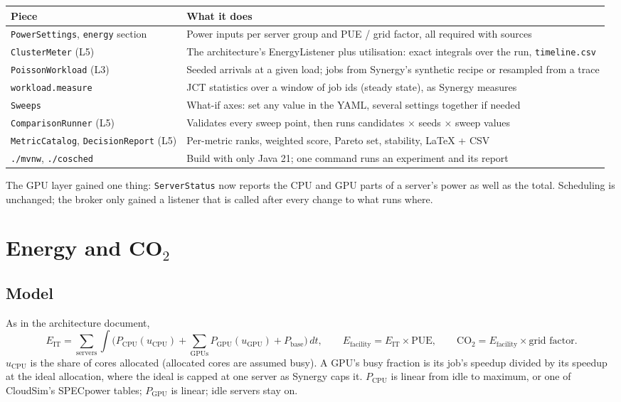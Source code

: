 \documentclass[11pt,a4paper]{article}
\newcommand{\code}[1]{\texttt{#1}}
\begin{document}
\begin{center}
\begin{tabularx}{\linewidth}{@{}lX@{}}
\toprule
Piece & What it does \\
\midrule
\code{PowerSettings}, \code{energy} section & Power inputs per server group and PUE / grid factor, all required with sources \\
\code{ClusterMeter} (L5) & The architecture's EnergyListener plus utilisation: exact integrals over the run, \code{timeline.csv} \\
\code{PoissonWorkload} (L3) & Seeded arrivals at a given load; jobs from Synergy's synthetic recipe or resampled from a trace \\
\code{workload.measure} & JCT statistics over a window of job ids (steady state), as Synergy measures \\
\code{Sweeps} & What-if axes: set any value in the YAML, several settings together if needed \\
\code{ComparisonRunner} (L5) & Validates every sweep point, then runs candidates $\times$ seeds $\times$ sweep values \\
\code{MetricCatalog}, \code{DecisionReport} (L5) & Per-metric ranks, weighted score, Pareto set, stability, LaTeX + CSV \\
\code{./mvnw}, \code{./cosched} & Build with only Java 21; one command runs an experiment and its report \\
\bottomrule
\end{tabularx}
\end{center}

The GPU layer gained one thing: \code{ServerStatus} now reports the CPU and GPU parts of a server's power as well
as the total. Scheduling is unchanged; the broker only gained a listener that is called after every change to
what runs where.

\section{Energy and CO$_2$}

\subsection{Model}
As in the architecture document,
\begin{equation*}
E_{\text{IT}} = \sum_{\text{servers}} \int \Big( P_{\text{CPU}}(u_{\text{CPU}}) + \sum_{\text{GPUs}} P_{\text{GPU}}(u_{\text{GPU}})
  + P_{\text{base}} \Big)\, dt, \qquad E_{\text{facility}} = E_{\text{IT}} \times \text{PUE}, \qquad
\text{CO}_2 = E_{\text{facility}} \times \text{grid factor}.
\end{equation*}
$u_{\text{CPU}}$ is the share of cores allocated (allocated cores are assumed busy). A GPU's busy fraction is its
job's speedup divided by its speedup at the ideal allocation, where the ideal is capped at one server as Synergy
caps it. $P_{\text{CPU}}$ is linear from idle to maximum, or one of CloudSim's SPECpower tables;
$P_{\text{GPU}}$ is linear; idle servers stay on.
\end{document}
